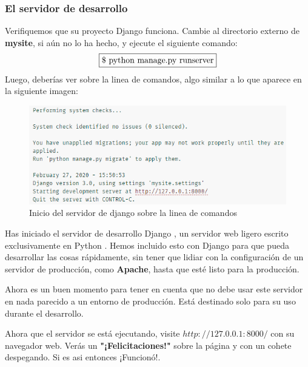 \documentclass[10pt]{article}
\newcommand{\py}[1]{{\textcolor{B}{Python} #1}}
\newcommand{\django}[1]{{\textcolor{G}{Django} #1}}
\begin{document}
\subsubsection{El servidor de desarrollo}

Verifiquemos que su proyecto \django{} funciona. Cambie al directorio externo de \textbf{mysite}, si aún no lo ha hecho, y ejecute el siguiente comando:
$$
\fbox{\$ python manage.py runserver}
$$
Luego, deberías ver sobre la linea de comandos, algo similar a lo que aparece en la siguiente imagen:

\begin{figure}[H]
  \begin{center}
  	 \includegraphics{figuras/3/31/312/img1.png}	 
	 \renewcommand{\arraystretch}{1.3}
	 \caption{Inicio del servidor de django sobre la linea de comandos}
  \end{center}
\end{figure}

Has iniciado el servidor de desarrollo \django{}, un servidor web ligero escrito exclusivamente en \py{}. Hemos incluido esto con \django{} para que pueda desarrollar las cosas rápidamente, sin tener que lidiar con la configuración de un servidor de producción, como \textbf{Apache}, hasta que esté listo para la producción.


Ahora es un buen momento para tener en cuenta que no debe usar este servidor en nada parecido a un entorno de producción. Está destinado solo para su uso durante el desarrollo. 

Ahora que el servidor se está ejecutando, visite $http://127.0.0.1:8000/$ con su navegador web. Verás un \textbf{"¡Felicitaciones!"} sobre la página y con un cohete despegando. Si es asi entonces ¡Funcionó!.
\end{document}
